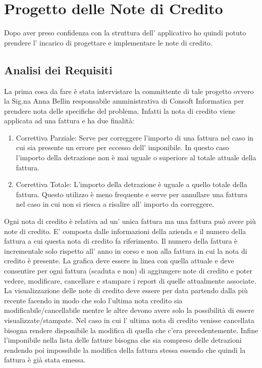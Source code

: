 \documentclass[12pt]{book}
\begin{document}
\chapter{Progetto delle Note di Credito}
Dopo aver preso confidenza con la struttura dell' applicativo ho quindi potuto
prendere l' incarico di progettare e implementare le note di credito.
\section{Analisi dei Requisiti}
La prima cosa da fare è stata intervistare la committente di tale progetto 
ovvero la Sig.na Anna Bellin responsabile amministrativa di Consoft Informatica
per prendere nota delle specifiche del problema.
Infatti la nota di credito viene applicata ad una fattura e ha due finalità:
\begin{enumerate}
    \item Correttiva Parziale: Serve per correggere l’importo di una fattura 
        nel caso in cui sia presente un errore per eccesso dell’ imponibile. 
        In questo caso l’importo della detrazione non è mai uguale o superiore 
        al totale attuale della fattura. 
    \item Correttiva Totale: L’importo della detrazione è uguale a quello 
        totale della fattura. Questo utilizzo è meno frequente e serve per 
        annullare una fattura nel caso in cui non si riesca a risalire 
        all’ importo da correggere.
\end{enumerate}
Ogni nota di credito è relativa ad un’ unica fattura ma una fattura può avere 
più note di credito.
E’ composta dalle informazioni della azienda e il numero della fattura a cui 
questa nota di credito fa riferimento.
Il numero della fattura è incrementale solo rispetto all’ anno in corso e non 
alla fattura in cui la nota di credito è presente.
La grafica deve essere in linea con quella attuale e deve consentire per ogni 
fattura (scaduta e non) di aggiungere note di credito e poter vedere, 
modificare, cancellare e stampare i report di quelle attualmente associate.
La visualizzazione delle note di credito deve essere per data partendo dalla 
più recente facendo in modo che solo l’ultima nota credito sia 
modificabile/cancellabile mentre le altre devono avere solo la possibilità di 
essere visualizzate/stampate.
Nel caso in cui l’ ultima nota di credito venisse cancellata bisogna rendere 
disponibile la modifica di quella che c’era precedentemente.
Infine l’imponibile nella lista delle fatture bisogna che sia compreso delle 
detrazioni rendendo poi impossibile la modifica della fattura stessa essendo 
che quindi la fattura è già stata emessa.
\end{document}
